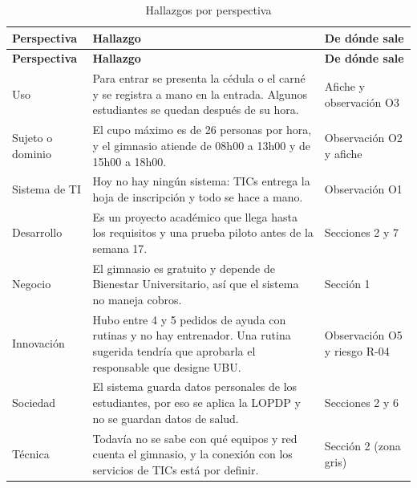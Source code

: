 \begingroup
\small
\renewcommand{\arraystretch}{1.2}
\begin{longtable}{|p{2.6cm}|p{8.6cm}|p{3.2cm}|}
\caption{Hallazgos por perspectiva}\label{tab:perspectivas}\\\hline
\textbf{Perspectiva} & \textbf{Hallazgo} & \textbf{De dónde sale} \\ \hline
\endfirsthead
\hline \textbf{Perspectiva} & \textbf{Hallazgo} & \textbf{De dónde sale} \\ \hline
\endhead
Uso & Para entrar se presenta la cédula o el carné y se registra a mano en la entrada. Algunos estudiantes se quedan después de su hora. & Afiche y observación O3 \\ \hline
Sujeto o dominio & El cupo máximo es de 26 personas por hora, y el gimnasio atiende de 08h00 a 13h00 y de 15h00 a 18h00. & Observación O2 y afiche \\ \hline
Sistema de TI & Hoy no hay ningún sistema: TICs entrega la hoja de inscripción y todo se hace a mano. & Observación O1 \\ \hline
Desarrollo & Es un proyecto académico que llega hasta los requisitos y una prueba piloto antes de la semana 17. & Secciones 2 y 7 \\ \hline
Negocio & El gimnasio es gratuito y depende de Bienestar Universitario, así que el sistema no maneja cobros. & Sección 1 \\ \hline
Innovación & Hubo entre 4 y 5 pedidos de ayuda con rutinas y no hay entrenador. Una rutina sugerida tendría que aprobarla el responsable que designe UBU. & Observación O5 y riesgo R-04 \\ \hline
Sociedad & El sistema guarda datos personales de los estudiantes, por eso se aplica la LOPDP y no se guardan datos de salud. & Secciones 2 y 6 \\ \hline
Técnica & Todavía no se sabe con qué equipos y red cuenta el gimnasio, y la conexión con los servicios de TICs está por definir. & Sección 2 (zona gris) \\ \hline
\end{longtable}
\endgroup
